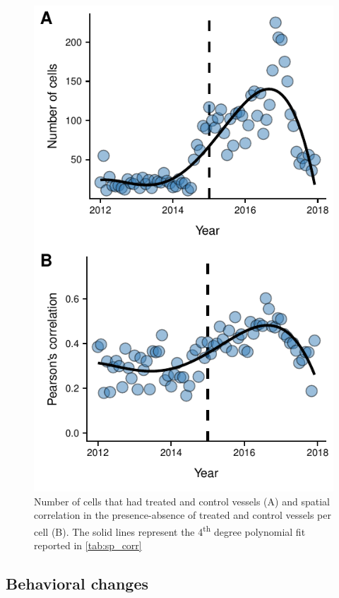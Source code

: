 \documentclass[9p,twocolumn,twoside,lineno]{pnas-new}
\begin{document}
\begin{figure}[H]
\centering
\includegraphics{img/sp_corr.pdf}
\caption{\label{fig:sp_corr}Number of cells that had treated and control vessels (A) and spatial correlation in the presence-absence of treated and control vessels per cell (B). The solid lines represent the 4\textsuperscript{th} degree polynomial fit reported in \ref{tab:sp_corr}}
\end{figure}

\subsection{Behavioral changes}
\end{document}
